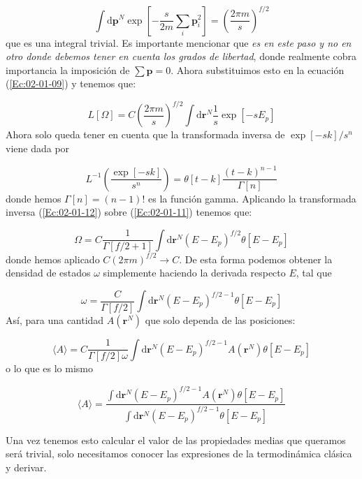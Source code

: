 \documentclass[11pt]{article} %
\newcommand{\parentesis}[1]{\left( #1  \right)}
\newcommand{\ccorchetes}[1]{\left[ #1  \right]}
\newcommand{\D}{\mathrm{d}}
\newcommand{\pn}{\mathbf{p}}
\newcommand{\rn}{\mathbf{r}}
\begin{document}
\begin{equation}
	\int \D \pn^N \exp \ccorchetes{- \frac{s}{2m} \sum_i \pn_i^2} =  \parentesis{\frac{2\pi m}{s}}^{f/2}
\end{equation}
que es una integral trivial. Es importante mencionar que \textit{es en este paso y no en otro donde debemos tener en cuenta los grados de libertad}, donde realmente cobra importancia la imposición de $\sum \pn = 0$. Ahora substituimos esto en la ecuación (\ref{Ec:02-01-09}) y tenemos que:

\begin{equation}
	L[\Omega] = C  \parentesis{\frac{2\pi m}{s}}^{f/2} \int \D \rn^N \frac{1}{s} \exp [-sE_p] \label{Ec:02-01-11}
\end{equation}
Ahora solo queda tener en cuenta que la transformada inversa de $\exp[-sk]/s^n$ viene dada por 

\begin{equation}
	L^{-1} \parentesis{\frac{\exp \ccorchetes{-sk}}{s^n}} = \theta [t-k] \frac{(t-k)^{n-1}}{\Gamma [n]} \label{Ec:02-01-12}
\end{equation}
donde hemos $\Gamma [n] = (n-1)!$ es la función gamma. Aplicando la transformada inversa (\ref{Ec:02-01-12}) sobre (\ref{Ec:02-01-11}) tenemos que:

\begin{equation}
	\Omega = C \frac{1}{\Gamma[f/2+1]} \int \D \rn^N (E-E_p)^{f/2} \theta [E-E_p]
\end{equation}
donde hemos aplicado $C (2\pi m)^{f/2}\rightarrow C$. De esta forma podemos obtener la densidad de estados $\omega$ simplemente haciendo la derivada respecto $E$, tal que 

\begin{equation}
	\omega = \frac{C}{\Gamma[f/2]} \int \D \rn^N (E-E_p)^{f/2-1} \theta [E-E_p]
\end{equation}
Así, para una cantidad $A(\rn^N)$ que solo dependa de las posiciones: 

\begin{equation}
	\langle A \rangle = C \frac{1}{\Gamma[f/2] \omega} \int \D \rn^N (E-E_p)^{f/2-1} A(\rn^N) \theta [E-E_p]
\end{equation}
o lo que es lo mismo

\begin{equation}
	\langle A \rangle = \frac{\int \D \rn^N (E-E_p)^{f/2-1} A(\rn^N) \theta [E-E_p]}{\int \D \rn^N (E-E_p)^{f/2-1}\theta [E-E_p]}
\end{equation}

Una vez tenemos esto calcular el valor de las propiedades medias que queramos será trivial, solo necesitamos conocer las expresiones de la termodinámica clásica y derivar.
\end{document}
